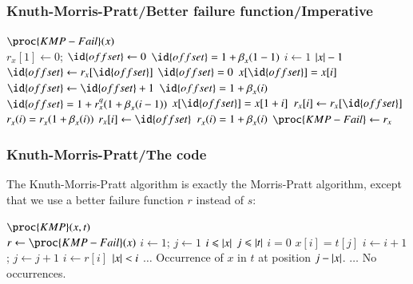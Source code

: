 %
\begin{frame}
\frametitle{Knuth-Morris-Pratt/Better failure function/Imperative}

{\small
\begin{codebox}
\(\proc{KMP-Fail} (x)\)\\
\li \(r_{x}[1] \gets 0\); \(\id{offset} \gets 0\)
    \RComment \(\id{offset} = 1 + \MPsupply{x}{}{1-1}\)
\li \For \(i \gets 1\) \To \(\lvert{x}\lvert{}-1\)
\li \Do \Repeat
\li       \(\id{offset} \gets r_{x}[\id{offset}]\)
\li     \Until \(\id{offset} = 0\) \LogOr \(x[\id{offset}] = x[i]\)
\li     \(\id{offset} \gets \id{offset} + 1\)
        \RComment \(\id{offset} = 1 + \MPsupply{x}{}{i}\)
\li     \RComment \(\id{offset} = 1 + \rX{x}{q}{1+\MPsupply{x}{}{i-1}}\)
\li     \If \(x[\id{offset}] = x[1+i]\)
\li     \Then \(r_{x}[i] \gets r_{x}[\id{offset}]\)
              \RComment \(r_{x}^{}(i) = r_{x}^{}(1+\beta_{x}^{}(i))\)
\li     \Else \(r_{x}[i] \gets \id{offset}\)
              \RComment \(r_{x}^{}(i) = 1 + \beta_{x}^{}(i)\)
        \End
    \End
\li \(\proc{KMP-Fail} \gets r_{x}\)
\end{codebox}
}

\end{frame}

%
\begin{frame}
\frametitle{Knuth-Morris-Pratt/The code}

The Knuth-Morris-Pratt algorithm is exactly the Morris-Pratt
algorithm, except that we use a better failure function \(r\) instead
of \(s\):
\begin{codebox}
\(\proc{KMP} (x, t)\)\\
\li \(r \gets \proc{KMP-Fail} (x)\)
\li \(i \gets 1\); \(j \gets 1\)
\li \While \(i \leqslant \lvert{x}\lvert{}\) \LogAnd \(j \leqslant \lvert{t}\lvert{}\)
\li \Do \If \(i = 0\) \LogOr \(x[i] = t[j]\)
\li	\Then \(i \gets i + 1\); \(j \gets j + 1\)
\li	\Else \(i \gets r[i]\)
        \End
    \End
\li \If \(\lvert{x}\lvert{} < i\)
\li \Then \(\ldots\) \RComment Occurrence of \(x\) in \(t\) at position \(j - \lvert{x}\lvert{}\).
\li \Else \(\ldots\) \RComment No occurrences.
    \End
\end{codebox}

\end{frame}

